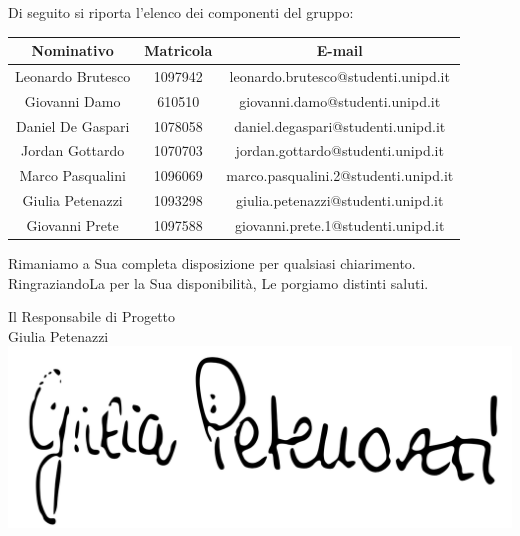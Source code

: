 \documentclass[a4paper,12pt]{letteracdp}
\begin{document}
		\newpage
		\begin{flushleft}
		Di seguito si riporta l'elenco dei componenti del gruppo:
		\vspace{1cm}
		\begin{center}
			\begin{tabular}{ccc}
				\toprule
				\textbf{Nominativo} & \textbf{Matricola} & \textbf{E-mail} \\
				\midrule
				Leonardo Brutesco	& 1097942	& leonardo.brutesco@studenti.unipd.it\\
				Giovanni Damo	& 610510	& giovanni.damo@studenti.unipd.it\\
				Daniel De Gaspari 	& 1078058	& daniel.degaspari@studenti.unipd.it\\
				Jordan Gottardo	& 1070703	& jordan.gottardo@studenti.unipd.it \\
				Marco Pasqualini	& 1096069	&  marco.pasqualini.2@studenti.unipd.it \\
				Giulia	Petenazzi		& 1093298	& giulia.petenazzi@studenti.unipd.it \\
				Giovanni Prete	& 1097588	& giovanni.prete.1@studenti.unipd.it \\
			\bottomrule
			\end{tabular}
		\end{center}
		\vspace{1cm}

		Rimaniamo a Sua completa disposizione per qualsiasi chiarimento. \\
		RingraziandoLa per la Sua disponibilità, Le porgiamo distinti saluti.
	\end{flushleft}
	\vspace{1cm}
	\begin{flushright}
		\center Il Responsabile di Progetto\\
        \center Giulia Petenazzi\\
		\includegraphics[scale=0.15]{"../Piano di progetto/img/Firme/giulia"}
	\end{flushright}
\end{document}
